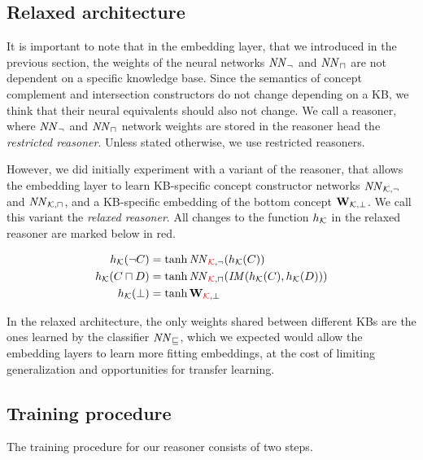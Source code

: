 \subsection{Relaxed architecture}
\label{sec:restricted}

It is important to note that in the embedding layer, that we introduced in the previous section, the weights of the neural networks $\mathit{NN}_\lnot$ and $\mathit{NN}_\sqcap$ are not dependent on a specific knowledge base.
Since the semantics of concept complement and intersection constructors do not change depending on a KB, we think that their neural equivalents should also not change.
We call a reasoner, where $\mathit{NN}_\lnot$ and $\mathit{NN}_\sqcap$ network weights are stored in the reasoner head the \emph{restricted reasoner}.
Unless stated otherwise, we use restricted reasoners.

However, we did initially experiment with a variant of the reasoner, that allows the embedding layer to learn KB-specific concept constructor networks $\mathit{NN}_{\mathcal{K},\lnot}$ and $\mathit{NN}_{\mathcal{K},\sqcap}$, and a KB-specific embedding of the bottom concept $\mathbf{W}_{\mathcal{K},\bot}$.
We call this variant the \emph{relaxed reasoner}.
All changes to the function $h_{\mathcal{K}}$ in the relaxed reasoner are marked below in red.

\begin{equation}
\label{eq:relaxed-encoder}
\begin{split}
    h_{\mathcal{K}}(\lnot C) &= \tanh \mathit{NN}_{\textcolor{red}{\mathcal{K}},\lnot}(h_{\mathcal{K}}(C)) \\
    h_{\mathcal{K}}(C \sqcap D) &= \tanh \mathit{NN}_{\textcolor{red}{\mathcal{K}},\sqcap}(\mathit{IM}(h_{\mathcal{K}}(C), h_{\mathcal{K}}(D))) \\
    h_{\mathcal{K}}(\bot) &= \tanh \mathbf{W}_{\textcolor{red}{\mathcal{K}},\bot} \\
\end{split}
\end{equation}

In the relaxed architecture, the only weights shared between different KBs are the ones learned by the classifier $\mathit{NN}_\sqsubseteq$, which we expected would allow the embedding layers to learn more fitting embeddings, at the cost of limiting generalization and opportunities for transfer learning.


\subsection{Training procedure}

The training procedure for our reasoner consists of two steps.

